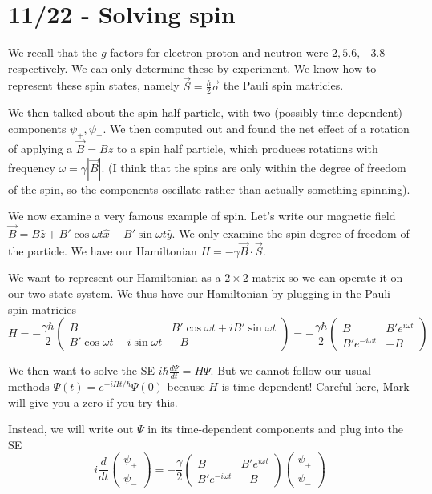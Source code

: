 \documentclass[10pt]{report}
\newcommand{\rd}[2]{\frac{d#1}{d#2}}
\newcommand{\abs}[1]{\left|#1\right|}
\begin{document}
\chapter{11/22 - Solving spin}

We recall that the $g$ factors for electron proton and neutron were $2,5.6,-3.8$ respectively. We can only determine these by experiment. We know how to represent these spin states, namely $\vec{S} = \frac{\hbar}{2}\vec{\sigma}$ the Pauli spin matricies.

We then talked about the spin half particle, with two (possibly time-dependent) components $\psi_+, \psi_-$. We then computed out and found the net effect of a rotation of applying a $\vec{B} = B\hat{z}$ to a spin half particle, which produces rotations with frequency $\omega = \gamma \abs{\vec{B}}$. (I think that the spins are only within the degree of freedom of the spin, so the components oscillate rather than actually something spinning).

We now examine a very famous example of spin. Let's write our magnetic field $\vec{B} = B\hat{z} + B'\cos \omega t \hat{x} - B'\sin \omega t \hat{y}$. We only examine the spin degree of freedom of the particle. We have our Hamiltonian $H = -\gamma \vec{B} \cdot \vec{S}$. 

We want to represent our Hamiltonian as a $2\times2$ matrix so we can operate it on our two-state system. We thus have our Hamiltonian by plugging in the Pauli spin matricies
$$H = -\frac{\gamma\hbar}{2}\begin{pmatrix} B & B'\cos \omega t + iB'\sin \omega t\\B' \cos \omega t - i\sin \omega t & -B\end{pmatrix} = -\frac{\gamma\hbar}{2}\begin{pmatrix} B & B'e^{i \omega t} \\ B'e^{-i\omega t} & -B\end{pmatrix}$$

We then want to solve the SE $i\hbar \rd{\Psi}{t} = H\Psi$. But we cannot follow our usual methods $\Psi(t) = e^{-iHt/\hbar}\Psi(0)$ because $H$ is time dependent! Careful here, Mark will give you a zero if you try this.

Instead, we will write out $\Psi$ in its time-dependent components and plug into the SE
$$i\rd{}{t}\begin{pmatrix}\psi_+\\ \psi_-\end{pmatrix} = -\frac{\gamma}{2}\begin{pmatrix} B & B'e^{i \omega t} \\ B'e^{-i\omega t} & -B\end{pmatrix}\begin{pmatrix}\psi_+\\ \psi_-\end{pmatrix}$$
\end{document}
